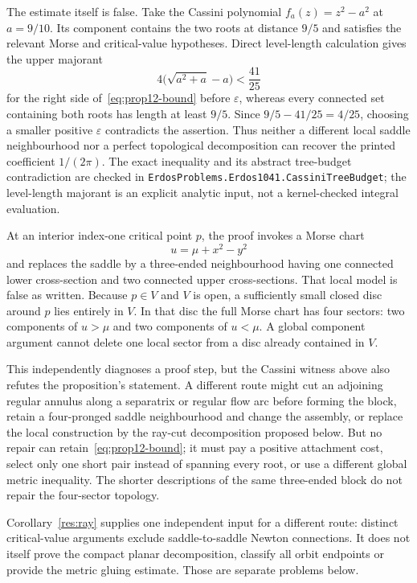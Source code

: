 \documentclass[11pt]{article}
\begin{document}
The estimate itself is false.  Take the Cassini polynomial
$f_a(z)=z^2-a^2$ at $a=9/10$.  Its component contains the two roots at distance
$9/5$ and satisfies the relevant Morse and critical-value hypotheses.  Direct
level-length calculation gives the upper majorant
\[
  4\bigl(\sqrt{a^2+a}-a\bigr)<\frac{41}{25}
\]
for the right side of~\eqref{eq:prop12-bound} before $\varepsilon$, whereas
every connected set containing both roots has length at least $9/5$.  Since
$9/5-41/25=4/25$, choosing a smaller positive $\varepsilon$ contradicts the
assertion.  Thus neither a different local saddle neighbourhood nor a perfect
topological decomposition can recover the printed coefficient $1/(2\pi)$.
The exact inequality and its abstract tree-budget contradiction are checked in
\texttt{ErdosProblems.Erdos1041.CassiniTreeBudget}; the level-length majorant is
an explicit analytic input, not a kernel-checked integral evaluation.

At an interior index-one critical point $p$, the proof invokes a Morse chart
\[
 u=\mu+x^2-y^2
\]
and replaces the saddle by a three-ended neighbourhood having one connected
lower cross-section and two connected upper cross-sections.  That local model
is false as written.  Because $p\in V$ and $V$ is open, a sufficiently small
closed disc around $p$ lies entirely in $V$.  In that disc the full Morse chart
has four sectors: two components of $u>\mu$ and two components of $u<\mu$.
A global component argument cannot delete one local sector from a disc already
contained in $V$.

This independently diagnoses a proof step, but the Cassini witness above also
refutes the proposition's statement.  A different route might
cut an adjoining regular annulus along a separatrix or regular flow arc before
forming the block, retain a four-pronged saddle neighbourhood and change the
assembly, or replace the local construction by the ray-cut decomposition
proposed below.  But no repair can retain~\eqref{eq:prop12-bound}; it must pay a
positive attachment cost, select only one short pair instead of spanning every
root, or use a different global metric inequality.
The shorter descriptions of the same three-ended block do not repair the
four-sector topology.

Corollary~\ref{res:ray} supplies one independent input for a different route:
distinct critical-value arguments exclude saddle-to-saddle Newton
connections.  It does not itself prove the compact planar decomposition,
classify all orbit endpoints or provide the metric gluing estimate.  Those are
separate problems below.
\end{document}
